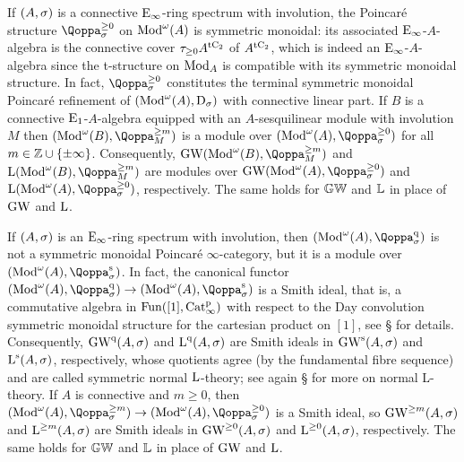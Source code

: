 \begin{example}
\label{example:geq-zero}%
If $(A,\sigma)$ is a connective ${\mathrm{E}_{\infty}}$-ring spectrum with involution, the Poincaré structure $\QF^{\geq 0}_{\sig}$ on $\operatorname{Mod}^{\omega}({A})$ is symmetric monoidal: its associated ${\mathrm{E}_{\infty}}$-$A$-algebra is the connective cover $\tau_{\geq 0} A^{{\mathrm{t}\mathrm{C_2}}}$ of $A^{{\mathrm{t}\mathrm{C_2}}}$, which is indeed an ${\mathrm{E}_{\infty}}$-$A$-algebra since the t-structure on $\operatorname{Mod}_A$ is compatible with its symmetric monoidal structure. In fact, $\QF^{\geq0}_{\sig}$ constitutes the terminal symmetric monoidal Poincaré refinement of $(\operatorname{Mod}^{\omega}({A}),\mathrm{D}_{\sigma})$ with connective linear part. If $B$ is a connective ${\mathrm{E}_{1}}$-$A$-algebra equipped with an $A$-sesquilinear module with involution $M$ then $(\Modp{B},\QF^{\geq m}_M)$ is a module over $(\Modp{A},\QF^{\geq 0}_{\sig})$ for all $m\in \mathbb{Z} \cup \{ \pm \infty \}$. Consequently, $\GW(\Modp{B},\QF^{\geq m}_M)$ and $\L(\Modp{B},\QF^{\geq m}_M)$ are modules over $\GW(\Modp{A},\QF^{\geq0}_\sig)$ and $\L(\Modp{A},\QF^{\geq0}_\sig)$, respectively. The same holds for $\mathbb{GW}$ and $\mathbb{L}$ in place of $\operatorname{GW}$ and $\operatorname L$.
\end{example}


\begin{example}
\label{example:ideal}%
If $(A,\sigma)$ is an ${\mathrm{E}_{\infty}}$-ring spectrum with involution, then $(\Modp{A},\QF^\qdr_\sig)$ is not a symmetric monoidal Poincar\'e $\infty$-category, but it is a module over $(\Modp{A},\QF^\sym_\sig)$. In fact, the canonical functor $(\Modp{A},\QF^\qdr_\sig) \to (\Modp{A},\QF^\sym_\sig)$ is a Smith ideal, that is, a commutative algebra in $\operatorname{Fun}([1],\mathrm{Cat}^{\mathrm p}_\infty)$ with respect to the Day convolution symmetric monoidal structure for the cartesian product on $[1]$, see \S{} for details. Consequently, $\operatorname{GW}^{\mathrm{q}}(A,\sigma)$ and $\operatorname L^{\mathrm{q}}(A,\sigma)$ are Smith ideals in $\operatorname{GW}^{\mathrm{s}}(A,\sigma)$ and $\operatorname L^{\mathrm{s}}(A,\sigma)$, respectively, whose quotients agree (by the fundamental fibre sequence) and are called symmetric normal $\operatorname L$-theory; 
see again \S{} for more on normal L-theory. If $A$ is connective and $m\geq 0$, then $(\Modp{A},\QF^{\geq m}_\sig) \to (\Modp{A},\QF^{\geq0}_\sig)$ is a Smith ideal, so $\operatorname{GW}^{\geq m}(A,\sigma)$ and $\operatorname L^{\geq m}(A,\sigma)$ are Smith ideals in $\operatorname{GW}^{\geq 0}(A,\sigma)$ and $\operatorname L^{\geq0}(A,\sigma)$, respectively.
The same holds for $\mathbb{GW}$ and $\mathbb{L}$ in place of $\operatorname{GW}$ and $\operatorname L$.
\end{example} 






